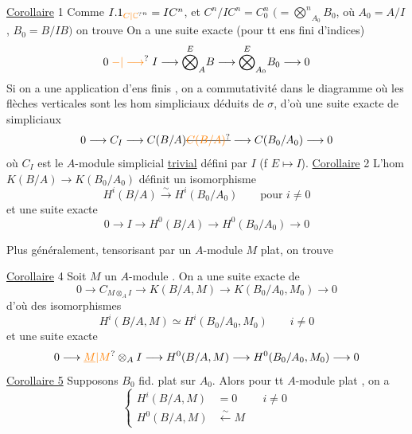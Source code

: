 \uline{Corollaire} 1 \quad Comme $I.1_{\unsure{C|\mathbb C}^{n}}=IC^n$, et $C^n/IC^n=C_0^n$ $(=\overset{n}{\bigotimes}_{A_0}B_0$, où $A_0=A/I$, $B_0=B/IB)$ on trouve On a une suite exacte (pour tt ens fini d'indices)
\[
0\mathrel{\unsure{-|\longrightarrow}} I\longrightarrow\overset E{\bigotimes}_{A}B\longrightarrow\overset E{\bigotimes}_{A_0}B_0\longrightarrow0
\]
Si on a une application d'ens finis , on a commutativité dans le diagramme 
où les flèches verticales sont les hom simpliciaux déduits de $\sigma$, d'où une suite exacte de   simpliciaux
\[
0\longrightarrow C_I\longrightarrow C(B/A)\deleted{\unsure{C(B/A)}}\longrightarrow C(B_0/A_0)\longrightarrow0
\]
où $C_I$ est le $A$-module simplicial \uline{trivial} défini par $I$ (f $E\mapsto I$).
\uline{Corollaire} 2 \quad L'hom $K(B/A)\longrightarrow K(B_0/A_0)$ définit un isomorphisme
\[
H^i(B/A)\xrightarrow{\sim}H^i(B_0/A_0)\qquad\text{pour }i\ne0
\]
et une suite exacte
\[
0\longrightarrow I\longrightarrow H^0(B/A)\longrightarrow H^0(B_0/A_0)\longrightarrow0
\]


Plus généralement, tensorisant par un $A$-module $M$ plat, on trouve

\uline{Corollaire} 4  \quad Soit $M$ un $A$-module . On a une suite exacte de  
\[
0\longrightarrow C_{M\otimes_A I}\longrightarrow K(B/A,M)\longrightarrow K(B_0/A_0,M_0)\longrightarrow0
\]
d'où des isomorphismes
\[
H^i(B/A,M)\simeq H^i(B_0/A_0,M_0)\qquad i\ne0
\]
et une suite exacte
\[
0\longrightarrow \unsure{\underline M|M}\otimes_A I\longrightarrow H^0(B/A,M)\longrightarrow H^0(B_0/A_0,M_0)\longrightarrow0
\]
\uline{Corollaire 5} \quad Supposons $B_0$ fid. plat sur $A_0$. Alors pour tt $A$-module plat , on a
\[
\left\{\begin{aligned}H^i(B/A,M)&=0 &&i\ne0\\
H^0(B/A,M)&\xleftarrow{\sim}M\end{aligned}\right.
\]

